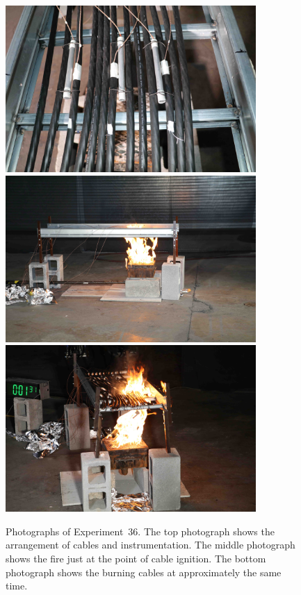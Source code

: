 \begin{figure}[p]
\centering
\includegraphics[height=2.50in]{../FIGURES/Test_36_setup} \\ \vspace{0.1in}
\includegraphics[height=2.50in]{../FIGURES/Test_36_side} \\ \vspace{0.1in}
\includegraphics[height=2.50in]{../FIGURES/Test_36_1_min_31_s}
\caption[Photographs of Experiment~36]{Photographs of Experiment~36. The top photograph shows the arrangement of cables and instrumentation. The middle photograph shows the fire just at the point of cable ignition. The bottom photograph shows the burning cables at approximately the same time.}
\label{fig:Test_36_photos}
\end{figure}


